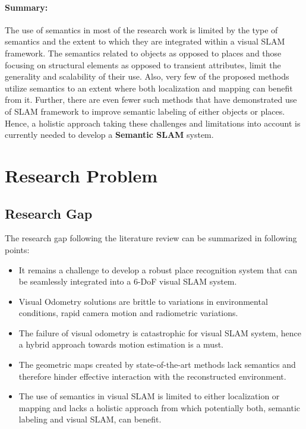 \documentclass{article}
\begin{document}
\paragraph{Summary:}
The use of semantics in most of the research work is limited by the type of semantics and the extent to which they are integrated within a visual SLAM framework. The semantics related to objects as opposed to places and those focusing on structural elements as opposed to transient attributes, limit the generality and scalability of their use. Also, very few of the proposed methods utilize semantics to an extent where both localization and mapping can benefit from it. Further, there are even fewer such methods that have demonstrated use of SLAM framework to improve semantic labeling of either objects or places. Hence, a holistic approach taking these challenges and limitations into account is currently needed to develop a \textbf{Semantic SLAM} system.


\section{Research Problem}

\subsection{Research Gap}
The research gap following the literature review can be summarized in following points:
\begin{itemize}
 \item It remains a challenge to develop a robust place recognition system that can be seamlessly integrated into a 6-DoF visual SLAM system.
 \item Visual Odometry solutions are brittle to variations in environmental conditions, rapid camera motion and radiometric variations.
 \item The failure of visual odometry is catastrophic for visual SLAM system, hence a hybrid approach towards motion estimation is a must.
 \item The geometric maps created by state-of-the-art methods lack semantics and therefore hinder effective interaction with the reconstructed environment.
 \item The use of semantics in visual SLAM is limited to either localization or mapping and lacks a holistic approach from which potentially both, semantic labeling and visual SLAM, can benefit.
\end{itemize}
\end{document}
